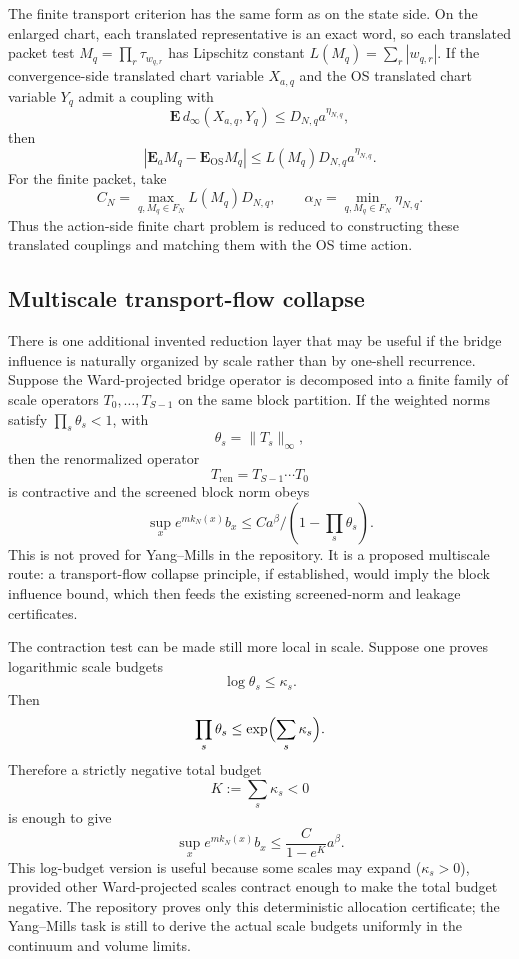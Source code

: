 The finite transport criterion has the same form as on the state side. On the
enlarged chart, each translated representative is an exact word, so each
translated packet test $M_q=\prod_r\tau_{w_{q,r}}$ has Lipschitz constant
$L(M_q)=\sum_r |w_{q,r}|$. If the convergence-side translated chart variable
$X_{a,q}$ and the OS translated chart variable $Y_q$ admit a coupling with
\[
  \mathbf E\,d_\infty(X_{a,q},Y_q)\leq D_{N,q}a^{\eta_{N,q}},
\]
then
\[
  \left|\mathbf E_aM_q-\mathbf E_{\mathrm{OS}}M_q\right|
  \leq L(M_q)D_{N,q}a^{\eta_{N,q}}.
\]
For the finite packet, take
\[
  C_N=\max_{q,M_q\in F_N}L(M_q)D_{N,q},
  \qquad
  \alpha_N=\min_{q,M_q\in F_N}\eta_{N,q}.
\]
Thus the action-side finite chart problem is reduced to constructing these
translated couplings and matching them with the OS time action.

\subsection{Multiscale transport-flow collapse}
There is one additional invented reduction layer that may be useful if the
bridge influence is naturally organized by scale rather than by one-shell
recurrence. Suppose the Ward-projected bridge operator is decomposed into a
finite family of scale operators $T_0,\ldots,T_{S-1}$ on the same block
partition. If the weighted norms satisfy $\prod_s \theta_s<1$, with
\[
  \theta_s=\|T_s\|_\infty,
\]
then the renormalized operator
\[
  T_{\mathrm{ren}}=T_{S-1}\cdots T_0
\]
is contractive and the screened block norm obeys
\[
  \sup_x e^{m k_N(x)} b_x \leq C a^\beta/(1-\prod_s\theta_s).
\]
This is not proved for Yang--Mills in the repository. It is a proposed
multiscale route: a transport-flow collapse principle, if established, would
imply the block influence bound, which then feeds the existing screened-norm
and leakage certificates.

The contraction test can be made still more local in scale. Suppose one proves
logarithmic scale budgets
\[
  \log\theta_s\leq \kappa_s .
\]
Then
\[
  \prod_s\theta_s\leq \exp\Bigl(\sum_s\kappa_s\Bigr).
\]
Therefore a strictly negative total budget
\[
  K:=\sum_s\kappa_s<0
\]
is enough to give
\[
  \sup_x e^{m k_N(x)} b_x
  \leq
  \frac{C}{1-e^K}a^\beta .
\]
This log-budget version is useful because some scales may expand
($\kappa_s>0$), provided other Ward-projected scales contract enough to make
the total budget negative. The repository proves only this deterministic
allocation certificate; the Yang--Mills task is still to derive the actual
scale budgets uniformly in the continuum and volume limits.

